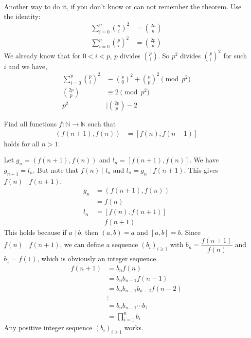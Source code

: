 \begin{remark}
	Another way to do it, if you don't know or can not remember the theorem. Use the identity:
		\begin{align*}
			\sum_{i=0}^{n}\binom ni^2 & = \binom{2n}{n}\\
			\sum_{i=0}^{p}\binom pi^2 & = \binom{2p}p
		\end{align*}
	We already know that for $0<i<p$, $p$ divides $\binom pi$. So $p^2$ divides $\binom pi^2$ for such $i$ and we have,
		\begin{align*}
			\sum_{i=0}^{p} \binom{p}{i}^2& \equiv \binom{p}0^2+\binom pp^2\pmod {p^2}\\
			\binom{2p}p & \equiv2\pmod{p^2}\\
			p^2 & \mid  \binom{2p}p-2
		\end{align*}
\end{remark}

\begin{problem}
	Find all functions $f:\mathbb{N}\to\mathbb{N}$ such that
		\begin{align*}
			(f(n+1),f(n)) & = [f(n),f(n-1)]
		\end{align*}
	holds for all $n>1$.
\end{problem}

\begin{solution}
	Let $g_n=(f(n+1),f(n))$ and $l_n=[f(n+1),f(n)]$. We have $g_{n+1} = l_n$. But note that $f(n)\mid l_n$ and $l_n=g_n\mid f(n+1)$. This gives $f(n)\mid f(n+1)$.
		\begin{align*}
			g_n
				& =(f(n+1),f(n))\\
				& =f(n)\\
			l_n
				& =[f(n),f(n+1)]\\
				& =f(n+1)
		\end{align*}
	This holds because if $a\mid b$, then $(a,b)=a$ and $[a,b]=b$. Since $f(n)\mid f(n+1)$, we can define a sequence $(b_i)_{i\geq1}$ with $b_n=\dfrac{f(n+1)}{f(n)}$ and $b_1=f(1)$, which is obviously an integer sequence.
		\begin{align*}
			f(n+1)  & = b_nf(n)\\
					& = b_nb_{n-1}f(n-1)\\
					& = b_nb_{n-1}b_{n-2}f(n-2)\\
					&  \vdots\\
					& = b_nb_{n-1}\cdots b_1\\
					& = \prod_{i=1}^{n}b_i
		\end{align*}
	Any positive integer sequence $(b_i)_{i\geq1}$ works.
\end{solution}

